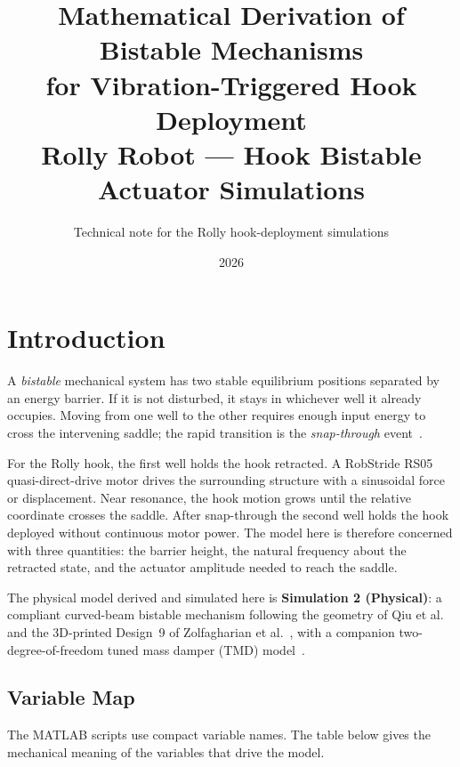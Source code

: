 \documentclass[11pt,letterpaper]{article}
\title{\textbf{Mathematical Derivation of Bistable Mechanisms\\for Vibration-Triggered Hook Deployment}\\[0.5em]
\large Rolly Robot --- Hook Bistable Actuator Simulations}
\author{Technical note for the Rolly hook-deployment simulations}
\date{2026}
\begin{document}
\maketitle
\tableofcontents
\newpage

\section{Introduction}
\label{sec:intro}

A \emph{bistable} mechanical system has two stable equilibrium positions
separated by an energy barrier. If it is not disturbed, it stays in whichever
well it already occupies. Moving from one well to the other requires enough
input energy to cross the intervening saddle; the rapid transition is the
\emph{snap-through} event~\cite{qiu2004,liu2023}.

For the Rolly hook, the first well holds the hook retracted. A RobStride RS05
quasi-direct-drive motor drives the surrounding structure with a sinusoidal
force or displacement. Near resonance, the hook motion grows until the relative
coordinate crosses the saddle. After snap-through the second well holds the hook
deployed without continuous motor power. The model here is therefore concerned
with three quantities: the barrier height, the natural frequency about the
retracted state, and the actuator amplitude needed to reach the saddle.

The physical model derived and simulated here is \textbf{Simulation 2 (Physical)}: a
compliant curved-beam bistable mechanism following the geometry of Qiu et al.~\cite{qiu2004}
and the 3D-printed Design~9 of Zolfagharian et al.~\cite{zolfagharian2025}, with a companion
two-degree-of-freedom tuned mass damper (TMD) model~\cite{denhartog1956}.

\subsection{Variable Map}
\label{ssec:variables_plain}

The MATLAB scripts use compact variable names. The table below gives the
mechanical meaning of the variables that drive the model.
\end{document}
